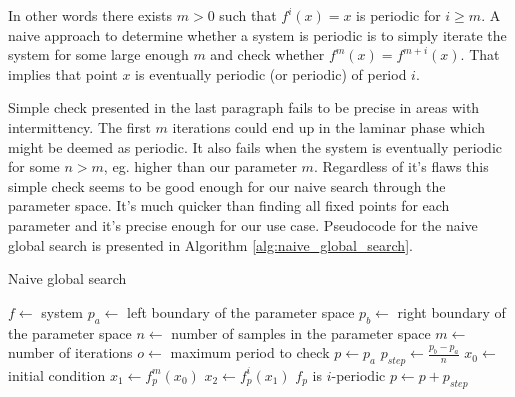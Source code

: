 In other words there exists $m > 0$ such that $f^{i}(x)=x$ is periodic for $i \geq m$.
A naive approach to determine whether a system is periodic is to simply iterate the system for some large enough $m$ and check whether $f^{m}(x)=f^{m+i}(x)$.
That implies that point $x$ is eventually periodic (or periodic) of period $i$.
\par
Simple check presented in the last paragraph fails to be precise in areas with intermittency.
The first $m$ iterations could end up in the laminar phase which might be deemed as periodic.
It also fails when the system is eventually periodic for some $n > m$, eg. higher than our parameter $m$.
Regardless of it's flaws this simple check seems to be good enough for our naive search through the parameter space.
It's much quicker than finding all fixed points for each parameter and it's precise enough for our use case.
Pseudocode for the naive global search is presented in Algorithm \ref{alg:naive_global_search}.

\begin{algorithm}[!h]
    \caption{Naive global search}
    \label{alg:naive_global_search}
    \begin{algorithmic}[1]
        \State $f \gets$ system
        \State $p_a \gets$ left boundary of the parameter space
        \State $p_b \gets$ right boundary of the parameter space
        \State $n \gets$ number of samples in the parameter space
        \State $m \gets$ number of iterations
        \State $o \gets$ maximum period to check
        \State $p \gets p_a$
        \State $p_{step} \gets \frac{p_b - p_a}{n}$
        \State $x_0 \gets$ initial condition
            \State $x_1 \gets f_{p}^{m}(x_0)$
                \State $x_2 \gets f_{p}^{i}(x_1)$
                    \State $f_p$ is $i$-periodic
                \EndIf
            \EndFor
            \State $p \gets p + p_{step}$
        \EndWhile
    \end{algorithmic}
\end{algorithm}


